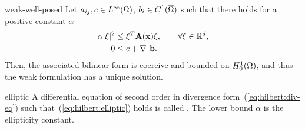 \begin{Lemma}{weak-well-posed}
  Let $a_{ij}, c\in L^\infty(\Omega)$, $b_i \in C^1(\overline{\Omega})$ such
  that there holds for a positive constant $\alpha$
  \begin{gather}
    \label{eq:hilbert:elliptic}
    \begin{split}
    \alpha\lvert\xi\rvert^2 &\le \xi^T \mathbf A(\mathbf x) \xi,
    \qquad \forall \xi \in \mathbb R^d,
    \\
    0 &\le c + \nabla\!\cdot\! \mathbf b.
    \end{split}
  \end{gather}
  Then, the associated bilinear form is coercive and bounded on
  $H^1_0(\Omega)$, and thus the weak formulation has a unique
  solution.
\end{Lemma}

\begin{Definition}{elliptic}
  A differential equation of second order in divergence
  form~(\ref{eq:hilbert:div-eq}) such that~(\ref{eq:hilbert:elliptic})
  holds is called . The lower bound $\alpha$ is the
  ellipticity constant.
\end{Definition}

